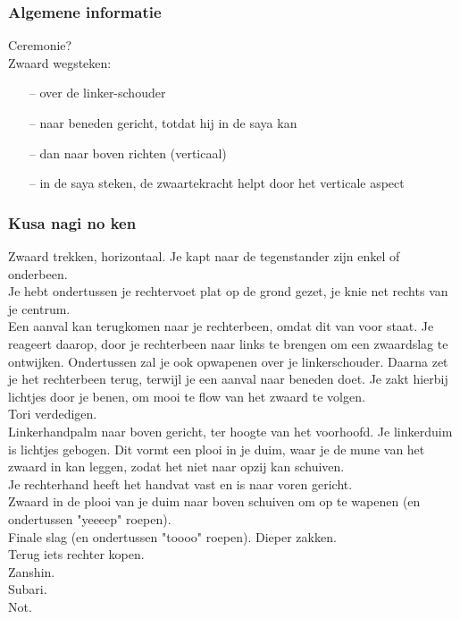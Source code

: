 \subsubsection{Algemene informatie}

Ceremonie?\\

Zwaard wegsteken:
\begin{itemize}
\item[--] over de linker-schouder
\item[--] naar beneden gericht, totdat hij in de saya kan
\item[--] dan naar boven richten (verticaal)
\item[--] in de saya steken, de zwaartekracht helpt door het verticale aspect
\end{itemize}


\subsubsection{Kusa nagi no ken}

\suwaristart
Zwaard trekken, horizontaal. Je kapt naar de tegenstander zijn enkel of onderbeen.\\
Je hebt ondertussen je rechtervoet plat op de grond gezet, je knie net rechts van je centrum.\\
Een aanval kan terugkomen naar je rechterbeen, omdat dit van voor staat. Je reageert daarop, door je rechterbeen naar links te brengen om een zwaardslag te ontwijken. Ondertussen zal je ook opwapenen over je linkerschouder. Daarna zet je het rechterbeen terug, terwijl je een aanval naar beneden doet. Je zakt hierbij lichtjes door je benen, om mooi te flow van het zwaard te volgen.\\
Tori verdedigen.\\
Linkerhandpalm naar boven gericht, ter hoogte van het voorhoofd. Je linkerduim is lichtjes gebogen. Dit vormt een plooi in je duim, waar je de mune van het zwaard in kan leggen, zodat het niet naar opzij kan schuiven.\\
Je rechterhand heeft het handvat vast en is naar voren gericht.\\
Zwaard in de plooi van je duim naar boven schuiven om op te wapenen (en ondertussen "yeeeep" roepen).\\
Finale slag (en ondertussen "toooo" roepen). Dieper zakken.\\
Terug iets rechter kopen.\\
Zanshin.\\
Subari.\\
Not.

